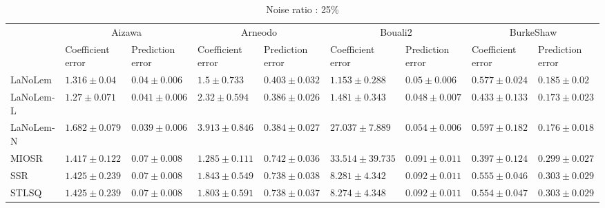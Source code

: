\begin{table*}
\centering
\caption{Noise ratio : 25\%}
\label{}
\scalebox{0.7}
{
\begin{tabular}{lllllllll}
\toprule
 & \multicolumn{2}{c}{Aizawa} & \multicolumn{2}{c}{Arneodo} & \multicolumn{2}{c}{Bouali2} & \multicolumn{2}{c}{BurkeShaw} \\
 & Coefficient error & Prediction error & Coefficient error & Prediction error & Coefficient error & Prediction error & Coefficient error & Prediction error \\
\midrule
LaNoLem & $1.316\pm 0.04$ & $0.04\pm 0.006$ & $1.5\pm 0.733$ & $0.403\pm 0.032$ & $\mathbf{1.153}\pm 0.288$ & $0.05\pm 0.006$ & $0.577\pm 0.024$ & $0.185\pm 0.02$ \\
LaNoLem-L & $\mathbf{1.27}\pm 0.071$ & $0.041\pm 0.006$ & $2.32\pm 0.594$ & $0.386\pm 0.026$ & $1.481\pm 0.343$ & $\mathbf{0.048}\pm 0.007$ & $0.433\pm 0.133$ & $\mathbf{0.173}\pm 0.023$ \\
LaNoLem-N & $1.682\pm 0.079$ & $\mathbf{0.039}\pm 0.006$ & $3.913\pm 0.846$ & $\mathbf{0.384}\pm 0.027$ & $27.037\pm 7.889$ & $0.054\pm 0.006$ & $0.597\pm 0.182$ & $0.176\pm 0.018$ \\
MIOSR & $1.417\pm 0.122$ & $0.07\pm 0.008$ & $\mathbf{1.285}\pm 0.111$ & $0.742\pm 0.036$ & $33.514\pm 39.735$ & $0.091\pm 0.011$ & $\mathbf{0.397}\pm 0.124$ & $0.299\pm 0.027$ \\
SSR & $1.425\pm 0.239$ & $0.07\pm 0.008$ & $1.843\pm 0.549$ & $0.738\pm 0.038$ & $8.281\pm 4.342$ & $0.092\pm 0.011$ & $0.555\pm 0.046$ & $0.303\pm 0.029$ \\
STLSQ & $1.425\pm 0.239$ & $0.07\pm 0.008$ & $1.803\pm 0.591$ & $0.738\pm 0.037$ & $8.274\pm 4.348$ & $0.092\pm 0.011$ & $0.554\pm 0.047$ & $0.303\pm 0.029$ \\

\midrule


\end{tabular}}
\end{table*}
